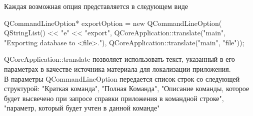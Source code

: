 Каждая возможная опция представляется в следующем виде
\begin{MyCode}
	QCommandLineOption* exportOption = new QCommandLineOption(
	QStringList() << "e"  
	<< "export",          
	QCoreApplication::translate("main", 
	"Exporting database to <file>."), 
	QCoreApplication::translate("main", "file"));
\end{MyCode}

QCoreApplication::translate позволяет использовать текст, указанный в его параметрах в качестве источника материала для локализации приложения. \\
В параметры QCommandLineOption  передается список строк со следующей структурой: "Краткая команда", "Полная Команда", "Описание команды, которое будет высвечено при запросе справки приложения в командной строке", "параметр, который будет учтен в данной команде"\\
